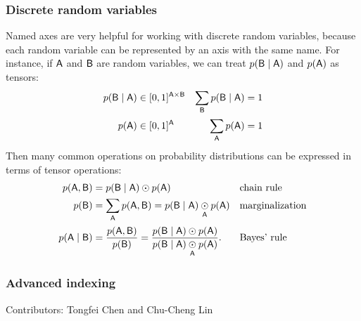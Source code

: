 \documentclass{article}
\begin{document}
\subsubsection{Discrete random variables}

Named axes are very helpful for working with discrete random variables, because each random variable can be represented by an axis with the same name. For instance, if $\name{A}$ and $\name{B}$ are random variables, we can treat $p(\name{B} \mid \name{A})$ and $p(\name{A})$ as tensors:
\begin{align*}
p(\name{B} \mid \name{A}) &\in [0, 1]^{\name{A} \times \name{B}} & \nsum{\name{B}} p(\name{B} \mid \name{A}) &= 1 \\
p(\name{A}) &\in [0, 1]^{\name{A}} & \nsum{\name{A}} p(\name{A}) &= 1
\end{align*}
Then many common operations on probability distributions can be expressed in terms of tensor operations:
\begin{align*}
p(\name{A}, \name{B}) &= p(\name{B} \mid \name{A}) \odot p(\name{A}) && \text{chain rule}\\
p(\name{B}) &= \nsum{\name{A}} p(\name{A}, \name{B}) = p(\name{B} \mid \name{A}) \ndot{\name{A}} p(\name{A}) && \text{marginalization} \\
p(\name{A} \mid \name{B}) &= \frac{p(\name{A}, \name{B})}{p(\name{B})} = \frac{p(\name{B} \mid \name{A}) \odot p(\name{A})}{p(\name{B} \mid \name{A}) \ndot{\name{A}} p(\name{A})}. && \text{Bayes' rule}
\end{align*}

\subsubsection{Advanced indexing}

Contributors: Tongfei Chen and Chu-Cheng Lin
\end{document}
